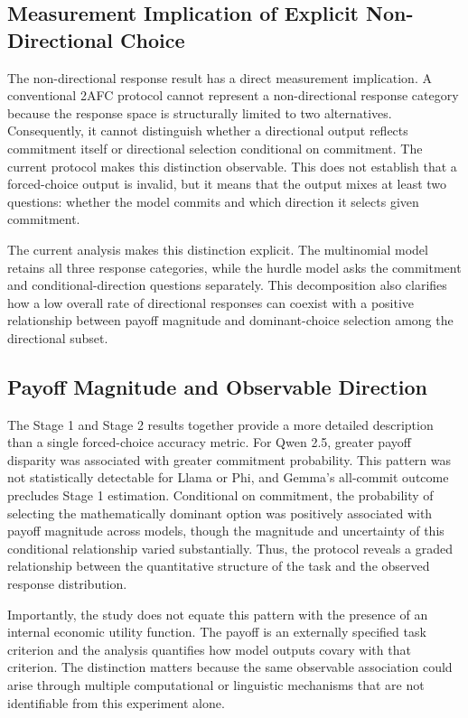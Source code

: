 \documentclass[10pt,journal,compsoc]{IEEEtran}
\begin{document}
\subsection{Measurement Implication of Explicit Non-Directional Choice}
The non-directional response result has a direct measurement implication. A conventional 2AFC protocol cannot represent a non-directional response category because the response space is structurally limited to two alternatives. Consequently, it cannot distinguish whether a directional output reflects commitment itself or directional selection conditional on commitment. The current protocol makes this distinction observable. This does not establish that a forced-choice output is invalid, but it means that the output mixes at least two questions: whether the model commits and which direction it selects given commitment.

The current analysis makes this distinction explicit. The multinomial model retains all three response categories, while the hurdle model asks the commitment and conditional-direction questions separately. This decomposition also clarifies how a low overall rate of directional responses can coexist with a positive relationship between payoff magnitude and dominant-choice selection among the directional subset.

\subsection{Payoff Magnitude and Observable Direction}
The Stage 1 and Stage 2 results together provide a more detailed description than a single forced-choice accuracy metric. For Qwen 2.5, greater payoff disparity was associated with greater commitment probability. This pattern was not statistically detectable for Llama or Phi, and Gemma's all-commit outcome precludes Stage 1 estimation. Conditional on commitment, the probability of selecting the mathematically dominant option was positively associated with payoff magnitude across models, though the magnitude and uncertainty of this conditional relationship varied substantially. Thus, the protocol reveals a graded relationship between the quantitative structure of the task and the observed response distribution.

Importantly, the study does not equate this pattern with the presence of an internal economic utility function. The payoff is an externally specified task criterion and the analysis quantifies how model outputs covary with that criterion. The distinction matters because the same observable association could arise through multiple computational or linguistic mechanisms that are not identifiable from this experiment alone.
\end{document}
